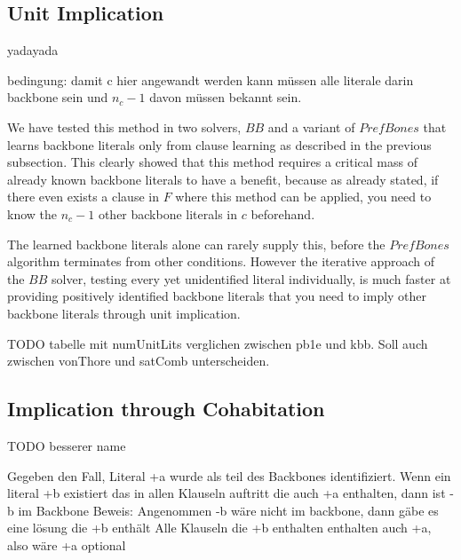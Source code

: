 \subsection{Unit Implication}

yadayada

bedingung: damit c hier angewandt werden kann müssen alle literale darin backbone sein und $n_c - 1$ davon müssen bekannt sein.


We have tested this method in two solvers, $BB$ and a variant of $PrefBones$ that learns backbone literals only from clause learning as described in the previous subsection. This clearly showed that this method requires a critical mass of already known backbone literals to have a benefit, because as already stated, if there even exists a clause in $F$ where this method can be applied, you need to know the $n_c - 1$ other backbone literals in $c$ beforehand.

The learned backbone literals alone can rarely supply this, before the $PrefBones$ algorithm terminates from other conditions. However the iterative approach of the $BB$ solver, testing every yet unidentified literal individually, is much faster at providing positively identified backbone literals that you need to imply other backbone literals through unit implication.

TODO tabelle mit numUnitLits verglichen zwischen pb1e und kbb. Soll auch zwischen vonThore und satComb unterscheiden.

\subsection{Implication through Cohabitation} TODO besserer name

Gegeben den Fall, Literal +a wurde als teil des Backbones identifiziert.\newline
Wenn ein literal +b existiert das in allen Klauseln auftritt die auch +a enthalten, dann ist -b im Backbone\newline
Beweis: Angenommen -b wäre nicht im backbone, dann gäbe es eine lösung die +b enthält\newline
Alle Klauseln die +b enthalten enthalten auch +a, also wäre +a optional\newline
